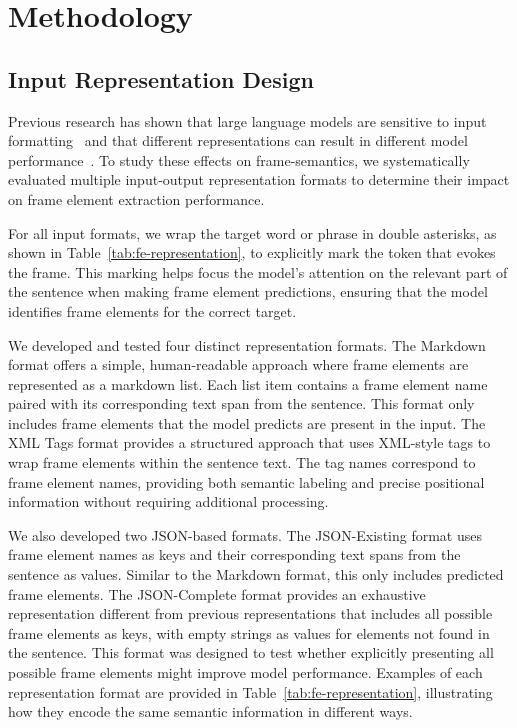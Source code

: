 \section{Methodology}


\subsection{Input Representation Design}
\label{sec:input-representation}
Previous research has shown that large language models are sensitive to input formatting~\cite{Sclar2023QuantifyingLM} and that different representations can result in different model performance~\cite{tam-etal-2024-speak,textsql-eval-gao-2024,exploring-marcos-2024}. To study these effects on frame-semantics, we systematically evaluated multiple input-output representation formats to determine their impact on frame element extraction performance.

For all input formats, we wrap the target word or phrase in double asterisks, as shown in Table~\ref{tab:fe-representation}, to explicitly mark the token that evokes the frame. This marking helps focus the model's attention on the relevant part of the sentence when making frame element predictions, ensuring that the model identifies frame elements for the correct target.

We developed and tested four distinct representation formats. The Markdown format offers a simple, human-readable approach where frame elements are represented as a markdown list. Each list item contains a frame element name paired with its corresponding text span from the sentence. This format only includes frame elements that the model predicts are present in the input. The XML Tags format provides a structured approach that uses XML-style tags to wrap frame elements within the sentence text. The tag names correspond to frame element names, providing both semantic labeling and precise positional information without requiring additional processing.

We also developed two JSON-based formats. The JSON-Existing format uses frame element names as keys and their corresponding text spans from the sentence as values. Similar to the Markdown format, this only includes predicted frame elements. The JSON-Complete format provides an exhaustive representation different from previous representations that includes all possible frame elements as keys, with empty strings as values for elements not found in the sentence. This format was designed to test whether explicitly presenting all possible frame elements might improve model performance. Examples of each representation format are provided in Table~\ref{tab:fe-representation}, illustrating how they encode the same semantic information in different ways.

